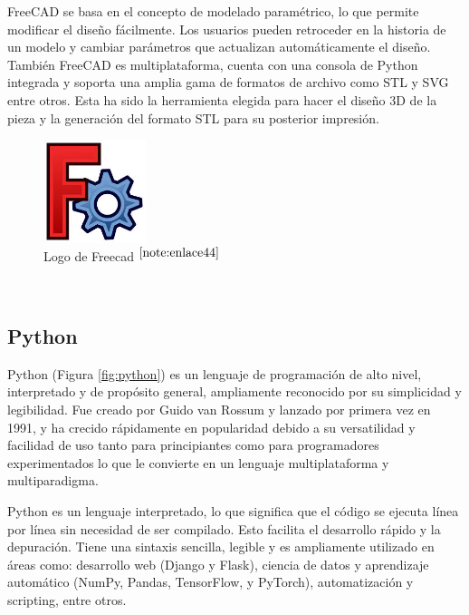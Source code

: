 FreeCAD se basa en el concepto de modelado paramétrico, lo que permite modificar el diseño fácilmente. Los usuarios pueden retroceder en la historia de un modelo y cambiar parámetros que actualizan automáticamente el diseño. También FreeCAD es multiplataforma, cuenta con una consola de Python integrada y soporta una amplia gama de formatos de archivo como STL y SVG entre otros. Esta ha sido la herramienta elegida para hacer el diseño 3D de la pieza y la generación del formato STL para su posterior impresión. 

\begin{figure} [h!]
	\begin{center}
		\includegraphics[width=3cm]{figs/freecad.png}
	\end{center}
	\caption{Logo de Freecad $^{\ref{note:enlace44}}$} 
	\label{fig:freecad}
\end{figure}\

\setcounter{footnote}{44} %

\subsection{Python}

Python (Figura \ref{fig:python}) es un lenguaje de programación de alto nivel, interpretado y de propósito general, ampliamente reconocido por su simplicidad y legibilidad. Fue creado por Guido van Rossum y lanzado por primera vez en 1991, y ha crecido rápidamente en popularidad debido a su versatilidad y facilidad de uso tanto para principiantes como para programadores experimentados lo que le convierte en un lenguaje multiplataforma y multiparadigma.

Python es un lenguaje interpretado, lo que significa que el código se ejecuta línea por línea sin necesidad de ser compilado. Esto facilita el desarrollo rápido y la depuración. Tiene una sintaxis sencilla, legible y es ampliamente utilizado en áreas como: desarrollo web (Django y Flask), ciencia de datos y aprendizaje automático (NumPy, Pandas, TensorFlow, y PyTorch), automatización y scripting, entre otros.

